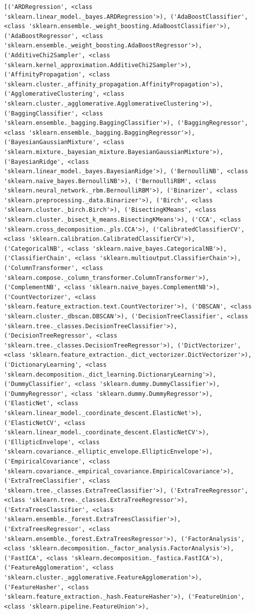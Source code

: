 \documentclass[
  letterpaper,
  DIV=11,
  numbers=noendperiod]{scrreprt}
\begin{document}
\begin{verbatim}
[('ARDRegression', <class 'sklearn.linear_model._bayes.ARDRegression'>), ('AdaBoostClassifier', <class 'sklearn.ensemble._weight_boosting.AdaBoostClassifier'>), ('AdaBoostRegressor', <class 'sklearn.ensemble._weight_boosting.AdaBoostRegressor'>), ('AdditiveChi2Sampler', <class 'sklearn.kernel_approximation.AdditiveChi2Sampler'>), ('AffinityPropagation', <class 'sklearn.cluster._affinity_propagation.AffinityPropagation'>), ('AgglomerativeClustering', <class 'sklearn.cluster._agglomerative.AgglomerativeClustering'>), ('BaggingClassifier', <class 'sklearn.ensemble._bagging.BaggingClassifier'>), ('BaggingRegressor', <class 'sklearn.ensemble._bagging.BaggingRegressor'>), ('BayesianGaussianMixture', <class 'sklearn.mixture._bayesian_mixture.BayesianGaussianMixture'>), ('BayesianRidge', <class 'sklearn.linear_model._bayes.BayesianRidge'>), ('BernoulliNB', <class 'sklearn.naive_bayes.BernoulliNB'>), ('BernoulliRBM', <class 'sklearn.neural_network._rbm.BernoulliRBM'>), ('Binarizer', <class 'sklearn.preprocessing._data.Binarizer'>), ('Birch', <class 'sklearn.cluster._birch.Birch'>), ('BisectingKMeans', <class 'sklearn.cluster._bisect_k_means.BisectingKMeans'>), ('CCA', <class 'sklearn.cross_decomposition._pls.CCA'>), ('CalibratedClassifierCV', <class 'sklearn.calibration.CalibratedClassifierCV'>), ('CategoricalNB', <class 'sklearn.naive_bayes.CategoricalNB'>), ('ClassifierChain', <class 'sklearn.multioutput.ClassifierChain'>), ('ColumnTransformer', <class 'sklearn.compose._column_transformer.ColumnTransformer'>), ('ComplementNB', <class 'sklearn.naive_bayes.ComplementNB'>), ('CountVectorizer', <class 'sklearn.feature_extraction.text.CountVectorizer'>), ('DBSCAN', <class 'sklearn.cluster._dbscan.DBSCAN'>), ('DecisionTreeClassifier', <class 'sklearn.tree._classes.DecisionTreeClassifier'>), ('DecisionTreeRegressor', <class 'sklearn.tree._classes.DecisionTreeRegressor'>), ('DictVectorizer', <class 'sklearn.feature_extraction._dict_vectorizer.DictVectorizer'>), ('DictionaryLearning', <class 'sklearn.decomposition._dict_learning.DictionaryLearning'>), ('DummyClassifier', <class 'sklearn.dummy.DummyClassifier'>), ('DummyRegressor', <class 'sklearn.dummy.DummyRegressor'>), ('ElasticNet', <class 'sklearn.linear_model._coordinate_descent.ElasticNet'>), ('ElasticNetCV', <class 'sklearn.linear_model._coordinate_descent.ElasticNetCV'>), ('EllipticEnvelope', <class 'sklearn.covariance._elliptic_envelope.EllipticEnvelope'>), ('EmpiricalCovariance', <class 'sklearn.covariance._empirical_covariance.EmpiricalCovariance'>), ('ExtraTreeClassifier', <class 'sklearn.tree._classes.ExtraTreeClassifier'>), ('ExtraTreeRegressor', <class 'sklearn.tree._classes.ExtraTreeRegressor'>), ('ExtraTreesClassifier', <class 'sklearn.ensemble._forest.ExtraTreesClassifier'>), ('ExtraTreesRegressor', <class 'sklearn.ensemble._forest.ExtraTreesRegressor'>), ('FactorAnalysis', <class 'sklearn.decomposition._factor_analysis.FactorAnalysis'>), ('FastICA', <class 'sklearn.decomposition._fastica.FastICA'>), ('FeatureAgglomeration', <class 'sklearn.cluster._agglomerative.FeatureAgglomeration'>), ('FeatureHasher', <class 'sklearn.feature_extraction._hash.FeatureHasher'>), ('FeatureUnion', <class 'sklearn.pipeline.FeatureUnion'>), 
\end{verbatim}
\end{document}
